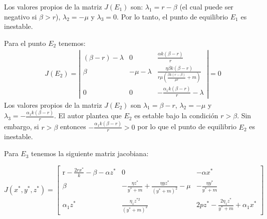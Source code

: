 \documentclass{wscpaperproc}
\theoremstyle{wsc}
\begin{document}
Los valores propios de la matriz $J(E_1)$ son: $\lambda_1 = r-\beta$ (el cual puede ser negativo si $\beta>r$), $\lambda_2= -\mu$ y $\lambda_3 = 0$. Por lo tanto, el punto de equilibrio $E_1$ es inestable.\par




Para el punto $E_2$ tenemos:
\begin{equation} \label{Equilibrium}
	\begin{aligned}
		 & J\left(E_2\right)=\left|\begin{array}{ccc}
			                           (\beta-r)-\lambda & 0            & \frac{\alpha k(\beta-r)}{r}                                                      \\
			                           \beta             & -\mu-\lambda & \frac{\eta \beta k(\beta-r)}{r \mu\left(\frac{\beta k(r-\beta)}{\mu r}+m\right)} \\
			                           0                 & 0            & -\frac{\alpha_1 k(\beta-r)}{r} - \lambda
		                           \end{array}\right|=0
	\end{aligned}
\end{equation}
Los valores propios de la matriz $J(E_2)$ son $\lambda_1 = \beta-r$, $\lambda_2=-\mu$ y $\lambda_3=-\frac{\alpha_1 k(\beta-r)}{r}$. El autor plantea que $E_2$ es estable bajo la condición $r>\beta$. Sin embargo, si $r>\beta$ entonces $-\frac{\alpha_1 k(\beta-r)}{r} > 0$ por lo que el punto de equilibrio $E_2$ es inestable. \par
Para $E_3$ tenemos la siguiente matriz jacobiana:

\begin{equation} \label{CharacteristicPolynomial}
	J\left(x^*, y^*, z^*\right)=\left[\begin{array}{ccc}
			\mathrm{r}-\frac{2 r x^*}{k}-\beta-\alpha z^* & 0                                                                   & -\alpha x^*                                     \\
			\beta                                         & -\frac{\eta z^*}{y^*+m}+\frac{\eta y z^*}{\left(y^*+m\right)^2}-\mu & -\frac{\eta y^*}{y^*+m}                         \\
			\alpha_1 z^*                                  & \frac{\eta_1 z^{* 2}}{\left(y^*+m\right)^2}                         & 2 p z^*-\frac{2 \eta_1 z^*}{y^*+m}+\alpha_1 x^*
		\end{array}\right]
\end{equation}
\end{document}
